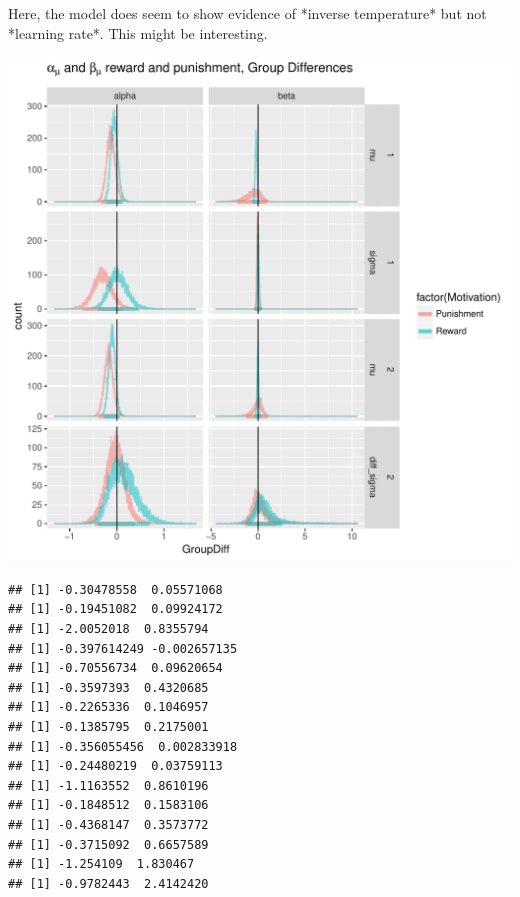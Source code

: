 \documentclass{article}\usepackage[]{graphicx}\usepackage[]{color}
\makeatletter
\def\maxwidth{ %
  \ifdim\Gin@nat@width>\linewidth
    \linewidth
  \else
    \Gin@nat@width
  \fi
}
\newenvironment{kframe}{%
 \def\at@end@of@kframe{}%
 \ifinner\ifhmode%
  \def\at@end@of@kframe{\end{minipage}}%
  \begin{minipage}{\columnwidth}%
 \fi\fi%
 \def\FrameCommand##1{\hskip\@totalleftmargin \hskip-\fboxsep
 \colorbox{shadecolor}{##1}\hskip-\fboxsep
     \hskip-\linewidth \hskip-\@totalleftmargin \hskip\columnwidth}%
 \MakeFramed {\advance\hsize-\width
   \@totalleftmargin\z@ \linewidth\hsize
   \@setminipage}}%
 {\par\unskip\endMakeFramed%
 \at@end@of@kframe}
\newenvironment{knitrout}{}{} %
\makeatother
\begin{document}
Here, the model does seem to show evidence of *inverse temperature* but not *learning rate*. This might be interesting.

\begin{knitrout}
\color{fgcolor}
\includegraphics[width=\maxwidth]{figure/unnamed-chunk-9-1} 
\begin{kframe}\begin{verbatim}
## [1] -0.30478558  0.05571068
## [1] -0.19451082  0.09924172
## [1] -2.0052018  0.8355794
## [1] -0.397614249 -0.002657135
## [1] -0.70556734  0.09620654
## [1] -0.3597393  0.4320685
## [1] -0.2265336  0.1046957
## [1] -0.1385795  0.2175001
## [1] -0.356055456  0.002833918
## [1] -0.24480219  0.03759113
## [1] -1.1163552  0.8610196
## [1] -0.1848512  0.1583106
## [1] -0.4368147  0.3573772
## [1] -0.3715092  0.6657589
## [1] -1.254109  1.830467
## [1] -0.9782443  2.4142420
\end{verbatim}
\end{kframe}

\end{knitrout}
\end{document}
